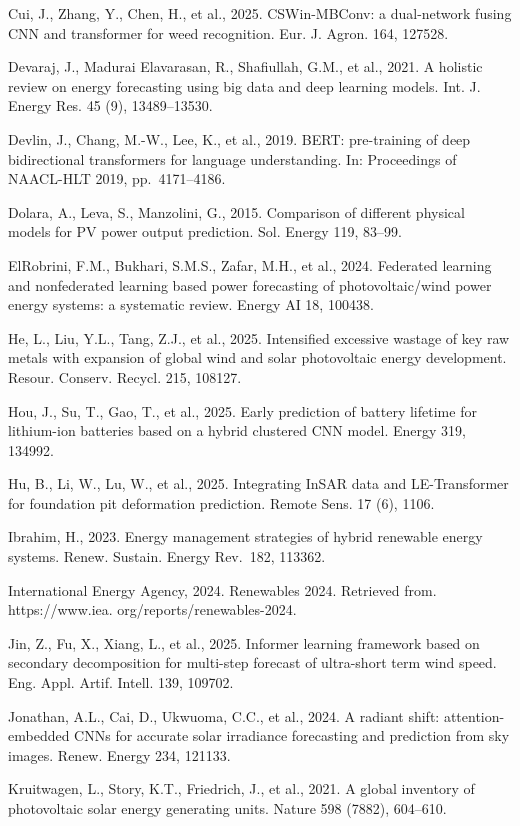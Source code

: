 \documentclass[
  10
]{article}
\begin{document}
Cui, J., Zhang, Y., Chen, H., et al., 2025. CSWin-MBConv: a dual-network
fusing CNN and transformer for weed recognition. Eur. J. Agron. 164,
127528.

Devaraj, J., Madurai Elavarasan, R., Shafiullah, G.M., et al., 2021. A
holistic review on energy forecasting using big data and deep learning
models. Int. J. Energy Res. 45 (9), 13489--13530.

Devlin, J., Chang, M.-W., Lee, K., et al., 2019. BERT: pre-training of
deep bidirectional transformers for language understanding. In:
Proceedings of NAACL-HLT 2019, pp.~4171--4186.

Dolara, A., Leva, S., Manzolini, G., 2015. Comparison of different
physical models for PV power output prediction. Sol. Energy 119, 83--99.

ElRobrini, F.M., Bukhari, S.M.S., Zafar, M.H., et al., 2024. Federated
learning and nonfederated learning based power forecasting of
photovoltaic/wind power energy systems: a systematic review. Energy AI
18, 100438.

He, L., Liu, Y.L., Tang, Z.J., et al., 2025. Intensified excessive
wastage of key raw metals with expansion of global wind and solar
photovoltaic energy development. Resour. Conserv. Recycl. 215, 108127.

Hou, J., Su, T., Gao, T., et al., 2025. Early prediction of battery
lifetime for lithium-ion batteries based on a hybrid clustered CNN
model. Energy 319, 134992.

Hu, B., Li, W., Lu, W., et al., 2025. Integrating InSAR data and
LE-Transformer for foundation pit deformation prediction. Remote Sens.
17 (6), 1106.

Ibrahim, H., 2023. Energy management strategies of hybrid renewable
energy systems. Renew. Sustain. Energy Rev.~182, 113362.

International Energy Agency, 2024. Renewables 2024. Retrieved from.
https://www.iea. org/reports/renewables-2024.

Jin, Z., Fu, X., Xiang, L., et al., 2025. Informer learning framework
based on secondary decomposition for multi-step forecast of ultra-short
term wind speed. Eng. Appl. Artif. Intell. 139, 109702.

Jonathan, A.L., Cai, D., Ukwuoma, C.C., et al., 2024. A radiant shift:
attention-embedded CNNs for accurate solar irradiance forecasting and
prediction from sky images. Renew. Energy 234, 121133.

Kruitwagen, L., Story, K.T., Friedrich, J., et al., 2021. A global
inventory of photovoltaic solar energy generating units. Nature 598
(7882), 604--610.
\end{document}
